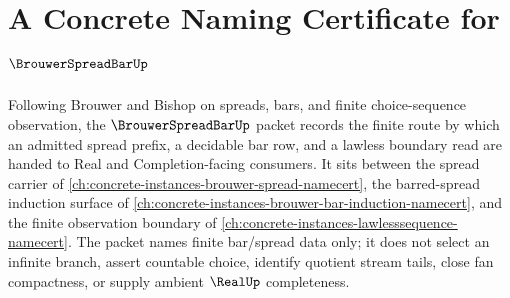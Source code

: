 \chapter{A Concrete Naming Certificate for $\BrouwerSpreadBarUp$}
\label{ch:concrete-instances-brouwer-spread-bar-namecert}

Following Brouwer and Bishop on spreads, bars, and finite choice-sequence observation, the $\BrouwerSpreadBarUp$ packet records the finite route by which an admitted spread prefix, a decidable bar row, and a lawless boundary read are handed to Real and Completion-facing consumers. It sits between the spread carrier of \autoref{ch:concrete-instances-brouwer-spread-namecert}, the barred-spread induction surface of \autoref{ch:concrete-instances-brouwer-bar-induction-namecert}, and the finite observation boundary of \autoref{ch:concrete-instances-lawlesssequence-namecert}. The packet names finite bar/spread data only; it does not select an infinite branch, assert countable choice, identify quotient stream tails, close fan compactness, or supply ambient $\RealUp$ completeness.

